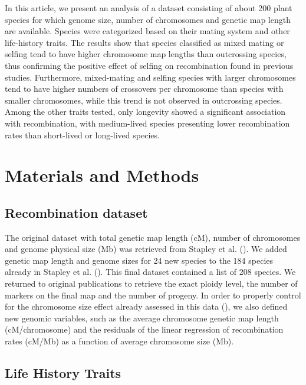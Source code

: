 \documentclass{article}
\begin{document}
In this article, we present an analysis of a dataset consisting of about 200 plant species for which genome size, number of chromosomes and genetic map length are available. Species were categorized based on their mating system and other life-history traits. The results show that species classified as mixed mating or selfing tend to have higher chromosome map lengths than outcrossing species, thus confirming the positive effect of selfing on recombination found in previous studies. Furthermore, mixed-mating and selfing species with larger chromosomes tend to have higher numbers of crossovers per chromosome than species with smaller chromosomes, while this trend is not observed in outcrossing species. Among the other traits tested, only longevity showed a significant association with recombination, with medium-lived species presenting lower recombination rates than short-lived or long-lived species.


\section*{Materials and Methods}


\subsection*{Recombination dataset}


The original dataset with total genetic map length (cM), number of chromosomes and genome physical size (Mb) was retrieved from Stapley et al. (\citeyear{stapleyVariationRecombinationFrequency2017}). We added genetic map length and genome sizes for 24 new species to the 184 species already in Stapley et al. (\citeyear{stapleyVariationRecombinationFrequency2017}). This final dataset contained a list of 208 species. We returned to original publications to retrieve the exact ploidy level, the number of markers on the final map and the number of progeny. In order to properly control for the chromosome size effect already assessed in this data (\cite{stapleyVariationRecombinationFrequency2017}), we also defined new genomic variables, such as the average chromosome genetic map length (cM/chromosome) and the residuals of the linear regression of recombination rates (cM/Mb) as a function of average chromosome size (Mb).


\subsection*{Life History Traits}
\end{document}

